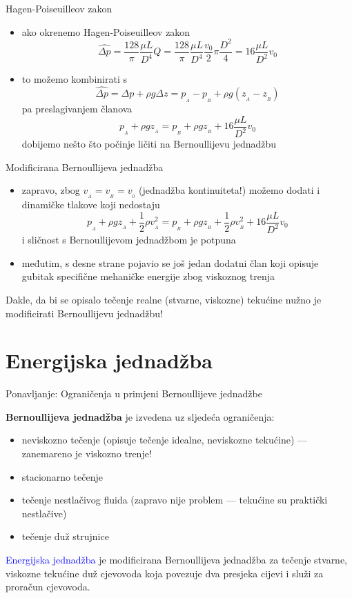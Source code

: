 \documentclass{beamer}
\begin{document}
\begin{frame}{Hagen-Poiseuilleov zakon}

\begin{itemize}
\item ako okrenemo Hagen-Poiseuilleov zakon
\[
\widehat{\Delta p}=\frac{128}{\pi}\frac{\mu L}{D^{4}}Q=\frac{128}{\pi}\frac{\mu L}{D^{4}}\frac{v_{0}}{2}\pi\frac{D^{2}}{4}=16\frac{\mu L}{D^{2}}v_{0}
\]
\item to možemo kombinirati s
\[
\widehat{\Delta p}=\Delta p+\rho g\Delta z=p_{_{A}}-p_{_{B}}+\rho g(z_{_{A}}-z_{_{B}})
\]
pa preslagivanjem članova 
\[
p_{_{A}}+\rho gz_{_{A}}=p_{_{B}}+\rho gz_{_{B}}+16\frac{\mu L}{D^{2}}v_{0}
\]
dobijemo nešto što počinje ličiti na Bernoullijevu jednadžbu
\end{itemize}
\end{frame}

\begin{frame}{Modificirana Bernoullijeva jednadžba}

\begin{itemize}
\item zapravo, zbog $v_{_{A}}=v_{_{B}}=v_{_{0}}$ (jednadžba kontinuiteta!)
možemo dodati i dinamičke tlakove koji nedostaju
\[
p_{_{A}}+\rho gz_{_{A}}+\frac{1}{2}\rho v_{_{A}}^{2}=p_{_{B}}+\rho gz_{_{B}}+\frac{1}{2}\rho v_{_{B}}^{2}+16\frac{\mu L}{D^{2}}v_{0}
\]
i sličnost s Bernoullijevom jednadžbom je potpuna
\item međutim, s desne strane pojavio se još jedan dodatni član koji opisuje
gubitak specifične mehaničke energije zbog viskoznog trenja
\end{itemize}
\begin{alertblock}{}
Dakle, da bi se opisalo tečenje realne (stvarne, viskozne) tekućine
nužno je modificirati Bernoullijevu jednadžbu!
\end{alertblock}
\end{frame}

\section{Energijska jednadžba}
\begin{frame}{Ponavljanje: Ograničenja u primjeni Bernoullijeve jednadžbe}

\textbf{Bernoullijeva jednadžba} je izvedena uz sljedeća ograničenja:
\begin{itemize}
\item neviskozno tečenje (opisuje tečenje idealne, neviskozne tekućine)
--- zanemareno je viskozno trenje!
\item stacionarno tečenje
\item tečenje nestlačivog fluida (zapravo nije problem --- tekućine su
praktički nestlačive)
\item tečenje duž strujnice
\end{itemize}
\begin{alertblock}{}
\textcolor{blue}{\large{}\alert{Energijska jednadžba}} je modificirana
Bernoullijeva jednadžba za tečenje stvarne, viskozne tekućine duž
cjevovoda koja povezuje dva presjeka cijevi i služi za proračun cjevovoda.
\end{alertblock}
\end{frame}
\end{document}
